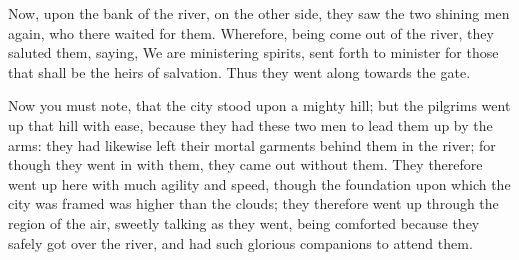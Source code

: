 Now, upon the bank of the river, on the other side, they saw the two shining men again, who there waited for them. Wherefore, being come out of the river, they saluted them, saying, We are ministering spirits, sent forth to minister for those that shall be the heirs of salvation. Thus they went along towards the gate.

Now you must note, that the city stood upon a mighty hill; but the pilgrims went up that hill with ease, because they had these two men to lead them up by the arms: they had likewise left their mortal garments behind them in the river; for though they went in with them, they came out without them. They therefore went up here with much agility and speed, though the foundation upon which the city was framed was higher than the clouds; they therefore went up through the region of the air, sweetly talking as they went, being comforted because they safely got over the river, and had such glorious companions to attend them.

